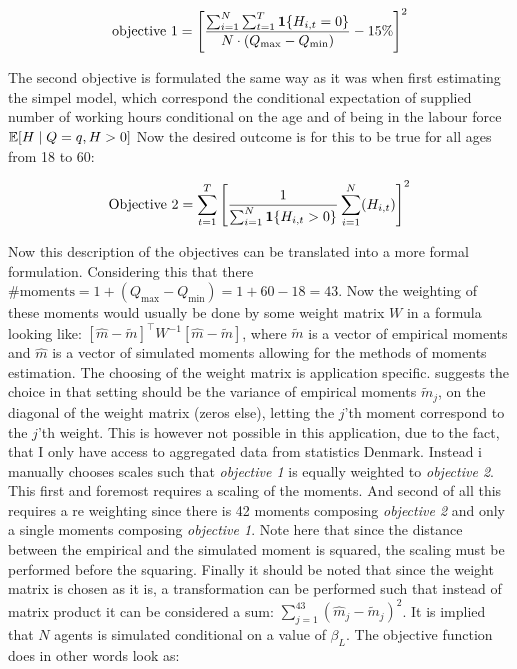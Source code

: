 \begin{equation}
    \text{objective 1} = \left[\frac{\sum_{i=1}^{N} \sum_{t=1}^T \mathbf{1}\{H_{i,t} = 0\}}{ N \cdot (Q_{\max} - Q_{\min} )} - 15\% \right]^2
\end{equation}

The second objective is formulated the same way as it was when first estimating the simpel model, which correspond the conditional expectation of supplied number of working hours conditional on the age and of being in the labour force $ \mathbb{E}[H \mid Q=q, H>0]$ Now the desired outcome is for this to be true for all ages from 18 to 60:


\begin{equation}
    \text{Objective 2} = \sum_{t=1}^{T} \left[ \frac{1}{\sum_{i=1}^{N} \mathbf{1}\{H_{i,t} > 0\}}\sum_{i=1}^N (H_{i,t})\right]^2
\end{equation}

Now this description of the objectives can be translated into a more formal formulation. Considering this that there $\text{\# moments}  = 1 + (Q_{\max} - Q_{\min}) = 1 + 60 - 18 = 43$. Now the weighting of these moments would usually be done by some weight matrix $W$ in a formula looking like: $[\hat{m} - \tilde{m}]^{\top} W^{-1} [\hat{m} - \tilde{m}]$, where $\tilde{m}$ is a vector of empirical moments and $\hat{m}$ is a vector of simulated moments allowing for the methods of moments estimation. The choosing of the weight matrix is application specific. \textcite{eisenhauer_estimation_2015} suggests the choice in that setting should be the variance of empirical moments $\tilde{m}_j$, on the diagonal of the weight matrix (zeros else), letting the $j$'th moment correspond to the $j$'th weight. This is however not possible in this application, due to the fact, that I only have access to aggregated data from statistics Denmark. Instead i manually chooses scales such that \textit{objective 1} is equally weighted to \textit{objective 2}. This first and foremost requires a scaling of the moments. And second of all this requires a re weighting since there is 42 moments composing \textit{objective 2} and only a single moments composing \textit{objective 1}. Note here that since the distance between the empirical and the simulated moment is squared, the scaling must be performed before the squaring. Finally it should be noted that since the weight matrix is chosen as it is, a transformation can be performed such that instead of matrix product it can be considered a sum: $\sum_{j = 1}
^{43} ( \hat{m}_j - \tilde{m}_j )^2$. It is implied that $N$ agents is simulated conditional on a value of $\beta_L$. The objective function does in other words look as:

